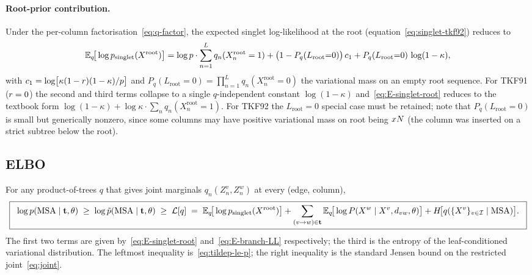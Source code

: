 \paragraph{Root-prior contribution.}
Under the per-column factorisation~\eqref{eq:q-factor}, the
expected singlet log-likelihood at the root
(equation~\eqref{eq:singlet-tkf92}) reduces to
\begin{equation}
\label{eq:E-singlet-root}
\mathbb{E}_q\!\big[\log p_{\text{singlet}}(X^{\text{root}})\big]
= \log p \cdot \sum_{n=1}^{L} q_n(X^{\text{root}}_n = 1)
   + \big(1 - P_q(L_{\text{root}}{=}0)\big)\,c_1
   + P_q(L_{\text{root}}{=}0)\,\log(1 - \kappa),
\end{equation}
with $c_1 = \log\!\big[\kappa(1-r)(1-\kappa)/p\big]$ and
$P_q(L_{\text{root}}{=}0) = \prod_{n=1}^{L} q_n(X^{\text{root}}_n = 0)$
the variational mass on an empty root sequence.
For TKF91 ($r = 0$) the second and third terms collapse to a
single $q$-independent constant $\log(1-\kappa)$ and~\eqref{eq:E-singlet-root}
reduces to the textbook form
$\log(1-\kappa) + \log\kappa \cdot \sum_n q_n(X^{\text{root}}_n = 1)$.
For TKF92 the $L_{\text{root}}{=}0$ special case must be retained;
note that $P_q(L_{\text{root}}{=}0)$ is small but generically nonzero,
since some columns may have positive variational mass on root being
$x{N}$ (the column was inserted on a strict subtree below the
root).

\subsection{ELBO}
\label{sec:varanc-presence-elbo-derivation}

For any product-of-trees $q$ that gives joint marginals
$q_n(Z^v_n, Z^w_n)$ at every (edge, column),
\begin{equation}
\label{eq:elbo}
\boxed{\;\;
\log p(\text{MSA} \mid \mathbf{t}, \theta)
\;\geq\;
\log \tilde{p}(\text{MSA} \mid \mathbf{t}, \theta)
\;\geq\;
\mathcal{L}[q]
\;=\;
\mathbb{E}_q\!\big[\log p_{\text{singlet}}(X^{\text{root}})\big]
+ \sum_{(v \to w) \in \mathbf{t}}
   \mathbb{E}_q\!\big[\log P(X^w \mid X^v, d_{vw}, \theta)\big]
+ H\!\big[q(\{X^v\}_{v \in \mathcal{I}} \mid \text{MSA})\big].
\;\;}
\end{equation}
The first two terms are given by~\eqref{eq:E-singlet-root}
and~\eqref{eq:E-branch-LL} respectively;
the third is the entropy of the leaf-conditioned variational
distribution.
The leftmost inequality is~\eqref{eq:tildep-le-p};
the right inequality is the standard Jensen bound on the restricted
joint~\eqref{eq:joint}.

